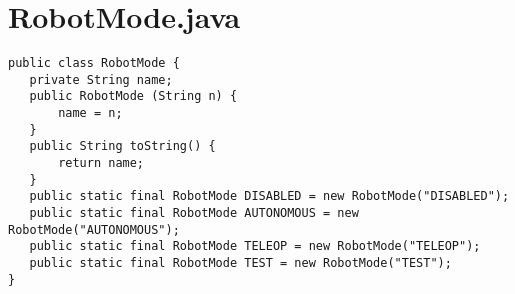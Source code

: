 \documentclass[]{article}
\begin{document}
\newpage

\appendix

\section{RobotMode.java}


\begin{lstlisting}
public class RobotMode {
   private String name;
   public RobotMode (String n) {
       name = n;
   } 
   public String toString() {
       return name;
   }
   public static final RobotMode DISABLED = new RobotMode("DISABLED");
   public static final RobotMode AUTONOMOUS = new RobotMode("AUTONOMOUS");
   public static final RobotMode TELEOP = new RobotMode("TELEOP");
   public static final RobotMode TEST = new RobotMode("TEST");
}
\end{lstlisting}

\newpage

\layout
\end{document}
